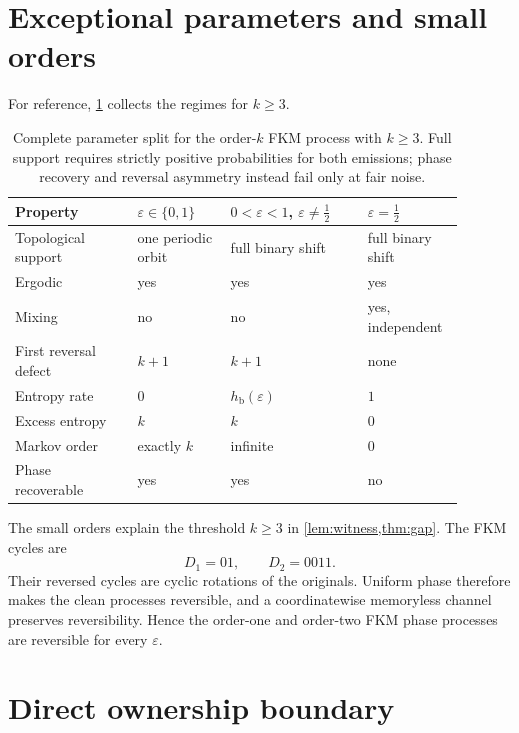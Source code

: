 \documentclass[11pt,a4paper]{amsart}
\theoremstyle{definition}
\theoremstyle{remark}
\newcommand{\hb}{h_{\mathrm b}}
\begin{document}
\section{Exceptional parameters and small orders}

For reference, \cref{tab:regimes} collects the regimes for $k\geq3$.

\begin{table}[ht]
\centering
\small
\setlength{\tabcolsep}{5pt}
\begin{tabular}{>{\raggedright\arraybackslash}p{0.25\linewidth}
                >{\centering\arraybackslash}p{0.19\linewidth}
                >{\centering\arraybackslash}p{0.28\linewidth}
                >{\centering\arraybackslash}p{0.17\linewidth}}
\toprule
Property
& $\varepsilon\in\{0,1\}$
& $0<\varepsilon<1$, $\varepsilon\neq\tfrac12$
& $\varepsilon=\tfrac12$\\
\midrule
Topological support & one periodic orbit & full binary shift & full binary shift\\
Ergodic & yes & yes & yes\\
Mixing & no & no & yes, independent\\
First reversal defect & $k+1$ & $k+1$ & none\\
Entropy rate & $0$ & $\hb(\varepsilon)$ & $1$\\
Excess entropy & $k$ & $k$ & $0$\\
Markov order & exactly $k$ & infinite & $0$\\
Phase recoverable & yes & yes & no\\
\bottomrule
\end{tabular}
\caption{Complete parameter split for the order-$k$ FKM process with
$k\geq3$.  Full support requires strictly positive probabilities for both
emissions; phase recovery and reversal asymmetry instead fail only at fair
noise.}
\label{tab:regimes}
\end{table}

The small orders explain the threshold $k\geq3$ in
\cref{lem:witness,thm:gap}.  The FKM cycles are
\[
 D_1=01,\qquad D_2=0011.
\]
Their reversed cycles are cyclic rotations of the originals.  Uniform phase
therefore makes the clean processes reversible, and a coordinatewise
memoryless channel preserves reversibility.  Hence the order-one and
order-two FKM phase processes are reversible for every $\varepsilon$.

\section{Direct ownership boundary}
\label{sec:ownership}
\end{document}
